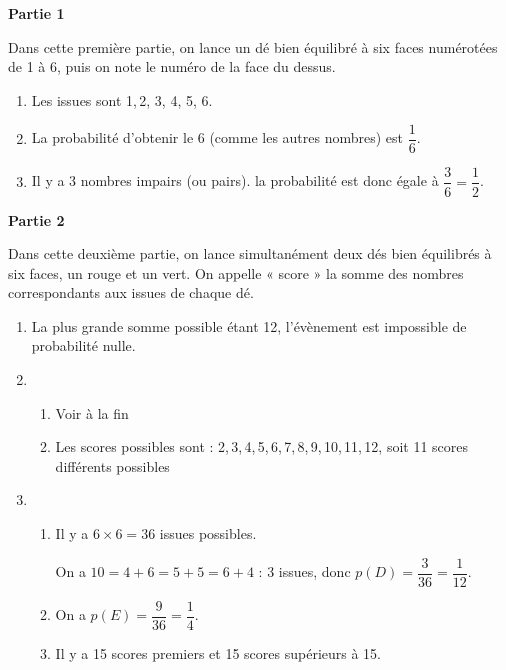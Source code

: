 
	\textbf{Partie 1}
	
	Dans cette première partie, on lance un dé bien équilibré à six faces numérotées de 1 à 6, puis on note le numéro de la face du dessus.
	
	\begin{enumerate}
		\item %
Les issues sont 1,\,2,\,\,3,\,\,4,\,\,5,\,\,6.
		\item %
La probabilité d'obtenir le 6 (comme les autres nombres) est $\dfrac{1}{6}$.
		
		\item %
Il y a 3 nombres impairs (ou pairs). la probabilité est donc égale à $\dfrac{3}{6} = \dfrac{1}{2}$.
	\end{enumerate}

	\textbf{Partie 2}
	
Dans cette deuxième partie, on lance simultanément deux dés bien équilibrés à six faces, un rouge et un vert. On appelle « score » la somme des nombres correspondants aux issues  de chaque dé.
	
	\begin{enumerate}
		\item %
La plus grande somme possible étant 12, l'évènement est impossible de probabilité nulle.
		
		\item %
		
		\begin{enumerate}
			\item %
Voir à la fin 
			\item %
			Les scores possibles sont : 2,\,3,\,4,\,5,\,6,\,7,\,8,\,9,\,10,\,11,\,12, soit 11 scores différents possibles 
		\end{enumerate}
\item 
	\begin{enumerate}
		\item %
		Il y a $6 \times 6 = 36$ issues possibles.
		
On a $10 = 4 + 6 = 5 + 5  = 6 + 4$ : 3 issues, donc $p(D) = \dfrac{3}{36} = \dfrac{1}{12}$.
		\item %
On a $p(E) = \dfrac{9}{36} = \dfrac{1}{4}$.
		\item %
Il y a 15 scores premiers et 15 scores supérieurs à 15.
		\end{enumerate}
	\end{enumerate}

